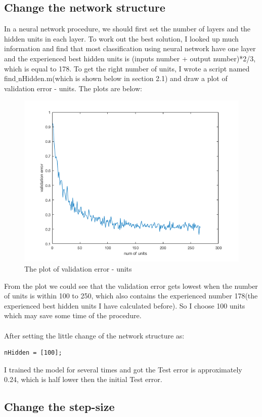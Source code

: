 \documentclass[12pt]{article}
\begin{document}
\subsection{Change the network structure}
In a neural network procedure, we should first set the number of layers and the hidden units in each layer. To work out the best solution, I looked up much information and find that most classification using neural network have one layer and the experienced best hidden units is (inputs number + output number)*2/3, which is equal to 178. To get the right number of units, I wrote a script named find$\_$nHidden.m(which is shown below in section 2.1) and draw a plot of validation error - units. The plots are below:
\begin{figure}[H]
	\centering
	\includegraphics[width=12cm]{findnHidden.png}
	\caption{The plot of validation error - units }
\end{figure}
From the plot we could see that the validation error gets lowest when the number of units is within 100 to 250, which also contains the experienced number 178(the experienced best hidden units I have calculated before). So I choose 100 units which may save some time of the procedure. \\
\\
After setting the little change of the network structure as:
\begin{lstlisting}
nHidden = [100];
\end{lstlisting}
I trained the model for several times and got the Test error is approximately 0.24, which is half lower then the  initial Test error.\\
\subsection{Change the step-size}
\end{document}
